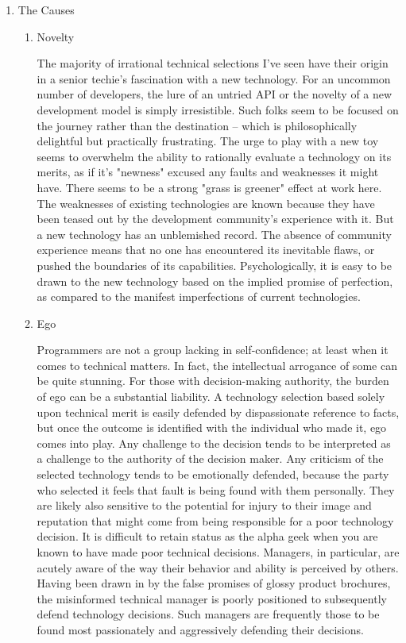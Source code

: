 \documentclass{article}
\begin{document}
\begin{enumerate}
\item The Causes
\label{sec:orgheadline36}

\begin{enumerate}
\item Novelty
\label{sec:orgheadline32}

The majority of irrational technical selections I've seen have their
origin in a senior techie's fascination with a new technology. For an
uncommon number of developers, the lure of an untried API or the novelty
of a new development model is simply irresistible. Such folks seem to be
focused on the journey rather than the destination -- which is
philosophically delightful but practically frustrating. The urge to play
with a new toy seems to overwhelm the ability to rationally evaluate a
technology on its merits, as if it's "newness" excused any faults and
weaknesses it might have. There seems to be a strong "grass is greener"
effect at work here. The weaknesses of existing technologies are known
because they have been teased out by the development community's
experience with it. But a new technology has an unblemished record. The
absence of community experience means that no one has encountered its
inevitable flaws, or pushed the boundaries of its capabilities.
Psychologically, it is easy to be drawn to the new technology based on
the implied promise of perfection, as compared to the manifest
imperfections of current technologies.

\item Ego
\label{sec:orgheadline33}

Programmers are not a group lacking in self-confidence; at least when it
comes to technical matters. In fact, the intellectual arrogance of some
can be quite stunning. For those with decision-making authority, the
burden of ego can be a substantial liability. A technology selection
based solely upon technical merit is easily defended by dispassionate
reference to facts, but once the outcome is identified with the
individual who made it, ego comes into play. Any challenge to the
decision tends to be interpreted as a challenge to the authority of the
decision maker. Any criticism of the selected technology tends to be
emotionally defended, because the party who selected it feels that fault
is being found with them personally. They are likely also sensitive to
the potential for injury to their image and reputation that might come
from being responsible for a poor technology decision. It is difficult
to retain status as the alpha geek when you are known to have made poor
technical decisions. Managers, in particular, are acutely aware of the
way their behavior and ability is perceived by others. Having been drawn
in by the false promises of glossy product brochures, the misinformed
technical manager is poorly positioned to subsequently defend technology
decisions. Such managers are frequently those to be found most
passionately and aggressively defending their decisions.


\end{enumerate}
\end{enumerate}
\end{document}
